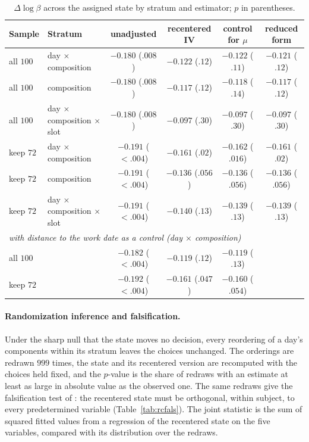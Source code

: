 \documentclass[11pt,a4paper]{article}
\theoremstyle{plain}
\theoremstyle{definition}
\begin{document}
\begin{table}[H]\centering
\caption{$\Delta\log\beta$ across the assigned state by stratum and estimator; $p$ in parentheses.}
\label{tab:rcstrata}
{\footnotesize
\begin{tabular}{llcccc}
\toprule
Sample & Stratum & unadjusted & recentered IV & control for $\mu$ & reduced form \\
\midrule
all $100$ & day $\times$ composition & $-0.180$ ($.008$) & $-0.122$ ($.12$) & $-0.122$ ($.11$) & $-0.121$ ($.12$) \\
all $100$ & composition & $-0.180$ ($.008$) & $-0.117$ ($.12$) & $-0.118$ ($.14$) & $-0.117$ ($.12$) \\
all $100$ & day $\times$ composition $\times$ slot & $-0.180$ ($.008$) & $-0.097$ ($.30$) & $-0.097$ ($.30$) & $-0.097$ ($.30$) \\
keep $72$ & day $\times$ composition & $-0.191$ ($<.004$) & $-0.161$ ($.02$) & $-0.162$ ($.016$) & $-0.161$ ($.02$) \\
keep $72$ & composition & $-0.191$ ($<.004$) & $-0.136$ ($.056$) & $-0.136$ ($.056$) & $-0.136$ ($.056$) \\
keep $72$ & day $\times$ composition $\times$ slot & $-0.191$ ($<.004$) & $-0.140$ ($.13$) & $-0.139$ ($.13$) & $-0.139$ ($.13$) \\
\midrule
\multicolumn{6}{l}{\emph{with distance to the work date as a control (day $\times$ composition)}} \\
all $100$ & & $-0.182$ ($<.004$) & $-0.119$ ($.12$) & $-0.119$ ($.13$) & \\
keep $72$ & & $-0.192$ ($<.004$) & $-0.161$ ($.047$) & $-0.160$ ($.054$) & \\
\bottomrule
\end{tabular}}
\end{table}

\paragraph{Randomization inference and falsification.} Under the sharp null that the state moves no decision, every
reordering of a day's components within its stratum leaves the choices unchanged. The orderings are redrawn $999$
times, the state and its recentered version are recomputed with the choices held fixed, and the $p$-value is the
share of redraws with an estimate at least as large in absolute value as the observed one. The same redraws give the
falsification test of \citet[Section~3.5]{borusyak2023}: the recentered state must be orthogonal, within subject,
to every predetermined variable (Table~\ref{tab:rcfals}). The joint statistic is the sum of squared fitted values from
a regression of the recentered state on the five variables, compared with its distribution over the redraws.
\end{document}
